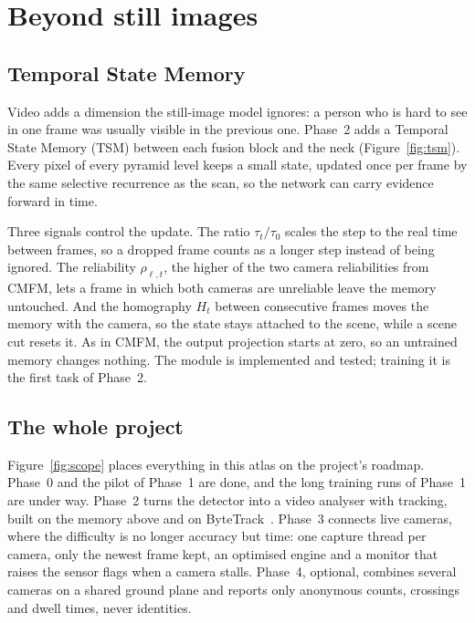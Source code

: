 \chapter{Beyond still images}

\section{Temporal State Memory}

Video adds a dimension the still-image model ignores: a person who is hard to see in one frame was usually visible
in the previous one. Phase~2 adds a Temporal State Memory (TSM) between each fusion block and the neck
(Figure~\ref{fig:tsm}). Every pixel of every pyramid level keeps a small state, updated once per frame by the same
selective recurrence as the scan, so the network can carry evidence forward in time.

Three signals control the update. The ratio $\tau_t/\tau_0$ scales the step to the real time between frames, so a
dropped frame counts as a longer step instead of being ignored. The reliability $\rho_{\ell,t}$, the higher of the
two camera reliabilities from CMFM, lets a frame in which both cameras are unreliable leave the memory untouched.
And the homography $H_t$ between consecutive frames moves the memory with the camera, so the state stays attached
to the scene, while a scene cut resets it. As in CMFM, the output projection starts at zero, so an untrained memory
changes nothing. The module is implemented and tested; training it is the first task of Phase~2.


\section{The whole project}

Figure~\ref{fig:scope} places everything in this atlas on the project's roadmap. Phase~0 and the pilot of Phase~1
are done, and the long training runs of Phase~1 are under way. Phase~2 turns the detector into a video analyser
with tracking, built on the memory above and on ByteTrack~\cite{zhang2022bytetrack}. Phase~3 connects live cameras,
where the difficulty is no longer accuracy but time: one capture thread per camera, only the newest frame kept, an
optimised engine and a monitor that raises the sensor flags when a camera stalls. Phase~4, optional, combines
several cameras on a shared ground plane and reports only anonymous counts, crossings and dwell times, never
identities.

